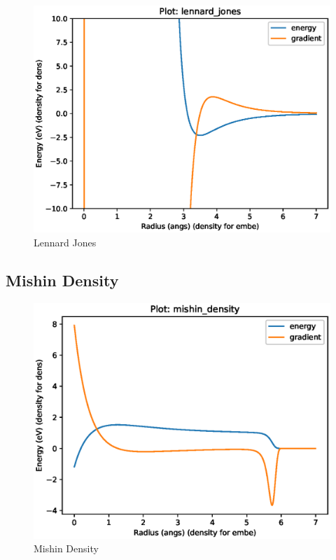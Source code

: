 \FloatBarrier
\begin{figure}[h]
  \begin{center}
    \includegraphics[width=0.7\linewidth]{appendix/functions/pots_plots/lennard_jones.eps}
    \caption{Lennard Jones}
    \label{figure:functionslennardjones}
  \end{center}
\end{figure}





\FloatBarrier
\subsection{Mishin Density}





\FloatBarrier
\begin{figure}[h]
  \begin{center}
    \includegraphics[width=0.7\linewidth]{appendix/functions/pots_plots/mishin_density.eps}
    \caption{Mishin Density}
    \label{figure:functionsmishindensity}
  \end{center}
\end{figure}




